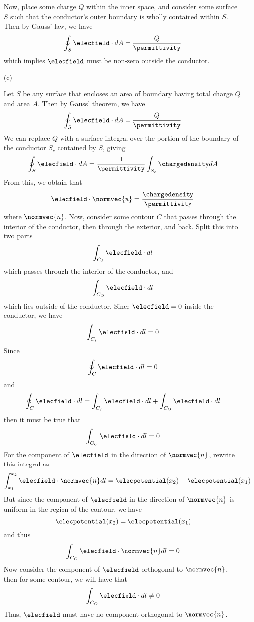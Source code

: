 \begin{itemize}
  Now, place some charge $Q$ within the inner space, and consider some
  surface $S$ such that the conductor's outer boundary is wholly
  contained within $S$.  Then by Gauss' law, we have
  \[
  \oint_S \elecfield \cdot dA = \frac{Q}{\permittivity}
  \]
  which implies $\elecfield$ must be non-zero outside the conductor.

\item[(c)]

  Let $S$ be any surface that encloses an area of boundary having
  total charge $Q$ and area $A$.  Then by Gauss' theorem, we have
  \[
  \oint_S \elecfield \cdot dA = \frac{Q}{\permittivity}
  \]
  We can replace $Q$ with a surface integral over the portion of the
  boundary of the conductor $S_c$ contained by $S$, giving
  \[
  \oint_S \elecfield \cdot dA
  =
  \frac{1}{\permittivity}\int_{S_c}\chargedensity dA
  \]
  From this, we obtain that
  \[
  \elecfield\cdot\normvec{n} = \frac{\chargedensity}{\permittivity}
  \]
  where $\normvec{n}$.  Now, consider some contour $C$ that passes through
  the interior of the conductor, then through the exterior, and back.
  Split this into two parts
  \[
  \int_{C_I} \elecfield\cdot dl
  \]
  which passes through the interior of the conductor, and
  \[
  \int_{C_O} \elecfield\cdot dl
  \]
  which lies outside of the conductor.  Since $\elecfield = 0$ inside
  the conductor, we have
  \[
  \int_{C_I} \elecfield\cdot dl = 0
  \]
  Since
  \[
  \oint_C \elecfield\cdot dl = 0
  \]
  and
  \[
  \oint_C \elecfield\cdot dl
  =
  \int_{C_I} \elecfield\cdot dl +
  \int_{C_O} \elecfield\cdot dl
  \]
  then it must be true that
  \[
  \int_{C_O} \elecfield\cdot dl = 0
  \]
  For the component of $\elecfield$ in the direction of $\normvec{n}$,
  rewrite this integral as
  \[
  \int_{x_1}^{x_2} \elecfield\cdot\normvec{n}dl
  =
  \elecpotential(x_2) - \elecpotential(x_1)
  \]
  But since the component of $\elecfield$ in the direction of
  $\normvec{n}$ is uniform in the region of the contour, we have
  \[
  \elecpotential(x_2) = \elecpotential(x_1)
  \]
  and thus
  \[
  \int_{C_O} \elecfield\cdot\normvec{n}dl
  =
  0
  \]
  Now consider the component of $\elecfield$ orthogonal to $\normvec{n}$,
  then for some contour, we will have that
  \[
  \int_{C_O} \elecfield\cdot dl
  \neq
  0
  \]
  Thus, $\elecfield$ must have no component orthogonal to $\normvec{n}$.

\end{itemize}
